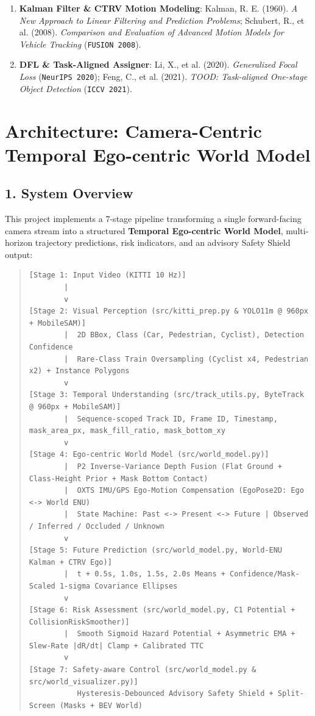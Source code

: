 \documentclass[10.5pt,a4paper]{article}
\begin{document}
\begin{enumerate}[leftmargin=1.8em,itemsep=2pt]
\item \textbf{Kalman Filter \& CTRV Motion Modeling}: Kalman, R. E. (1960). \textit{A New Approach to Linear Filtering and Prediction Problems}; Schubert, R., et al. (2008). \textit{Comparison and Evaluation of Advanced Motion Models for Vehicle Tracking} (\texttt{FUSION 2008}).
\item \textbf{DFL \& Task-Aligned Assigner}: Li, X., et al. (2020). \textit{Generalized Focal Loss} (\texttt{NeurIPS 2020}); Feng, C., et al. (2021). \textit{TOOD: Task-aligned One-stage Object Detection} (\texttt{ICCV 2021}).
\end{enumerate}
\newpage
\section{Architecture: Camera-Centric Temporal Ego-centric World Model}

\subsection{1. System Overview}

This project implements a 7-stage pipeline transforming a single forward-facing camera stream into a structured \textbf{Temporal Ego-centric World Model}, multi-horizon trajectory predictions, risk indicators, and an advisory Safety Shield output:


\begin{quote}\begin{footnotesize}\begin{verbatim}
[Stage 1: Input Video (KITTI 10 Hz)]
        |
        v
[Stage 2: Visual Perception (src/kitti_prep.py & YOLO11m @ 960px + MobileSAM)]
        |  2D BBox, Class (Car, Pedestrian, Cyclist), Detection Confidence
        |  Rare-Class Train Oversampling (Cyclist x4, Pedestrian x2) + Instance Polygons
        v
[Stage 3: Temporal Understanding (src/track_utils.py, ByteTrack @ 960px + MobileSAM)]
        |  Sequence-scoped Track ID, Frame ID, Timestamp, mask_area_px, mask_fill_ratio, mask_bottom_xy
        v
[Stage 4: Ego-centric World Model (src/world_model.py)]
        |  P2 Inverse-Variance Depth Fusion (Flat Ground + Class-Height Prior + Mask Bottom Contact)
        |  OXTS IMU/GPS Ego-Motion Compensation (EgoPose2D: Ego <-> World ENU)
        |  State Machine: Past <-> Present <-> Future | Observed / Inferred / Occluded / Unknown
        v
[Stage 5: Future Prediction (src/world_model.py, World-ENU Kalman + CTRV Ego)]
        |  t + 0.5s, 1.0s, 1.5s, 2.0s Means + Confidence/Mask-Scaled 1-sigma Covariance Ellipses
        v
[Stage 6: Risk Assessment (src/world_model.py, C1 Potential + CollisionRiskSmoother)]
        |  Smooth Sigmoid Hazard Potential + Asymmetric EMA + Slew-Rate |dR/dt| Clamp + Calibrated TTC
        v
[Stage 7: Safety-aware Control (src/world_model.py & src/world_visualizer.py)]
           Hysteresis-Debounced Advisory Safety Shield + Split-Screen (Masks + BEV World)
\end{verbatim}\end{footnotesize}\end{quote}
\end{document}
